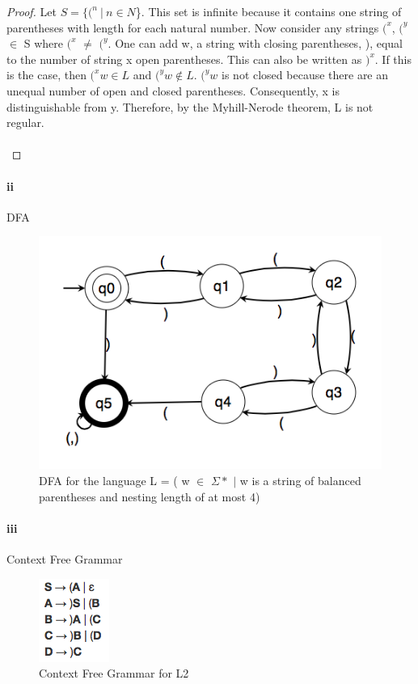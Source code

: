 \documentclass[10pt,letter]{article}
\begin{document}
\begin{proof}
Let $S = \{ (^n\ |\ n \in N$\}. This set is infinite because it contains one string of parentheses with length for each natural number. Now consider any strings $(^x$, $(^y$ $\in$ S where $(^x$ $\neq$ $(^y.$  One can add w, a  string with closing parentheses, ),  equal to the number of string x open parentheses. This can also be written as $)^x$. If this is the case, then  $(^xw \in L$ and $(^yw \notin L.$  $(^yw$ is not closed because there are an unequal number of open and closed parentheses. Consequently, x is distinguishable from y. Therefore, by the Myhill-Nerode theorem, L is not regular. \\ \\
\end{proof}

\paragraph{ii} DFA 

\begin{figure}[h]
    \centering
    \includegraphics[width=0.4\linewidth]{p2ii}
    \caption{DFA for the language L = ( w $\in$ $\Sigma*$ $\mid$ w is a string of balanced parentheses and nesting length of at most 4)}
    \label{fig:q1i}
\end{figure}

\paragraph{iii} Context Free Grammar \\
\begin{figure}[h]
    \centering
    \includegraphics[width=0.15\linewidth]{p2iii}
    \caption{Context Free Grammar for L2}
    \label{fig:q1i}
\end{figure}
\end{document}
